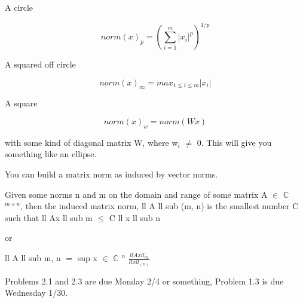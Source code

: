 \documentclass[12pt]{article}
\newcommand{\mt}[1]{\ensuremath{#1}}
\newcommand{\bc}{\mt{\mathbb{C}} }       %
\newcommand{\mem}{\mt{\in} }
\newcommand{\lse}{\mt{\leq} }
\newcommand{\eql}{\mt{=} }
\newcommand{\uw}[2]{#1\mt{_{#2}}}
\newcommand{\uf}[2]{#1\mt{^{#2}}}
\newcommand{\frc}[2]{\mt{\frac{#1}{#2}}}
\begin{document}
A circle

\begin{displaymath}
  norm(x)_p = (\sum_{i = 1}^m |x_i|^p)^{1/p}
\end{displaymath}

A squared off circle

\begin{displaymath}
  norm(x)_\infty = max_{1 \lse i \lse m} |x_i|
\end{displaymath}

A square

\begin{displaymath}
  norm(x)_w = norm(Wx)
\end{displaymath}

with some kind of diagonal matrix W, where \uw{w}{i} $\neq$ 0. This will give you something like an ellipse.

You can build a matrix norm as induced by vector norms.

Given some norms n and m on the domain and range of some matrix A \mem \uf{\bc}{m \times n}, then the induced matrix norm, ll A ll sub (m, n) is the smallest number C such that ll Ax ll sub m \lse C ll x ll sub n

or

ll A ll sub m, n \eql sup x \mem \uf{\bc}{n} \frc{ll Ax ll_m}{ll x ll_(n)}

Problems 2.1 and 2.3 are due Monday 2/4 or something, Problem 1.3 is due Wednesday 1/30.
\end{document}
